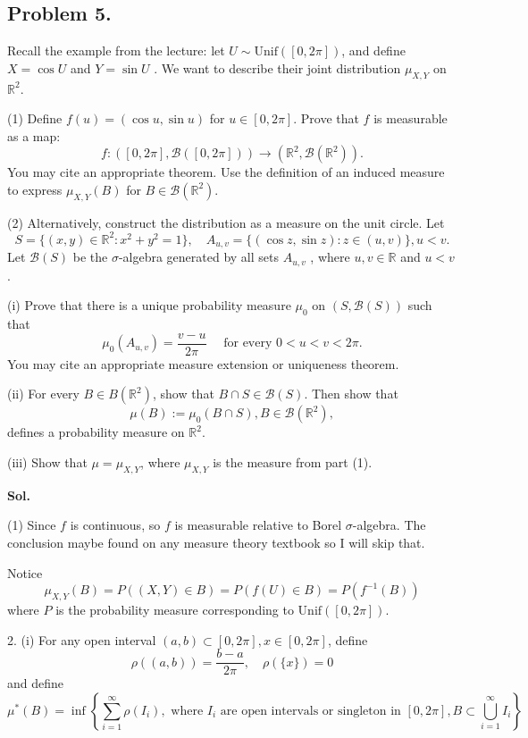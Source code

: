 \documentclass[lang=en,11pt,a4paper,citestyle =authoryear]{elegantpaper}
\newcommand{\R}{\mathbb{R}}
\newcommand{\B}{\mathcal{B}}
\begin{document}

\subsection*{Problem 5.} 

Recall the example from the lecture: let $U \sim \text{Unif}([0, 2\pi])$, and define $X = \cos U$ and $Y = \sin U$ . We want to describe their joint distribution $\mu_{X,Y}$ on $\R^2$.\par
(1) Define $f (u) = (\cos u, \sin u)$ for $u \in [0, 2\pi]$. Prove that $f$ is measurable as a map:\[f:([0, 2\pi], \B([0, 2\pi])) \to (\R^2, \B(\R^2)).\] You may cite an appropriate theorem. Use the definition of an induced measure to express
$\mu_{X,Y}(B)$ for $B \in \B(\R^2)$.\par
(2) Alternatively, construct the distribution as a measure on the unit circle. Let
\[S = \{(x, y) \in \R^2 : x^2 + y^2 = 1\},\quad  A_{u,v} = \{(\cos z, \sin z) : z \in (u, v)\}, u < v.\]
Let $\B(S)$ be the $\sigma$-algebra generated by all sets $A_{u,v}$ , where $u, v \in \R$ and $u < v$.\par
(i) Prove that there is a unique probability measure $\mu_0$ on $(S, \B(S))$ such that
\[\mu_0(A_{u,v} ) = \dfrac{v - u}{2\pi}\quad\text{ for every } 0 < u < v < 2\pi.\]
You may cite an appropriate measure extension or uniqueness theorem.\par
(ii) For every $B \in B(\R^2)$, show that $B \cap S \in \B(S)$. Then show that
\[
\mu(B) := \mu_0(B \cap S), B \in \B(\R^2),
\]
defines a probability measure on $\R^2$.\par
(iii) Show that $\mu = \mu_{X,Y}$, where $\mu_{X,Y}$ is the measure from part (1).
\par
\vspace{0.5em}
\textbf{Sol.} \par
(1) Since $f$ is continuous, so $f$ is measurable relative to Borel $\sigma$-algebra. The conclusion maybe found on any measure theory textbook so I will skip that.\par
Notice
\[\mu_{X,Y}(B) = P((X,Y) \in B) = P(f(U) \in B) = P(f^{-1}(B))\]
where $P$ is the probability measure corresponding to $\text{Unif}([0,2\pi])$.\par
2. (i) For any open interval $(a,b) \subset [0,2\pi], x\in [0,2\pi]$, define
\[\rho((a,b)) = \dfrac{b-a}{2\pi},\quad \rho(\{x\}) = 0\]
and define
\[
\mu^*(B) = \inf\left\{\sum\limits_{i=1}^{\infty} \rho(I_i), \text{ where }I_i\text{ are open intervals or singleton in }[0,2\pi], B\subset \bigcup_{i=1}^{\infty} I_i\right\}
\]
\end{document}
